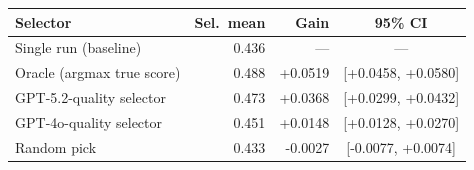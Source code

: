 \begin{tabular}{lrrc}
\toprule
Selector & Sel.\ mean & Gain & 95\% CI\\
\midrule
Single run (baseline) & 0.436 & --- & --- \\
\midrule
Oracle (argmax true score) & 0.488 & +0.0519 & [+0.0458, +0.0580] \\
GPT-5.2-quality selector & 0.473 & +0.0368 & [+0.0299, +0.0432] \\
GPT-4o-quality selector & 0.451 & +0.0148 & [+0.0128, +0.0270] \\
Random pick & 0.433 & -0.0027 & [-0.0077, +0.0074] \\
\bottomrule
\end{tabular}
